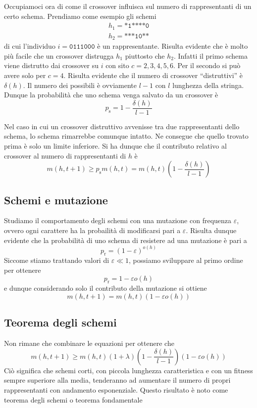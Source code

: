 \documentclass[a4paper, 11pt]{article}
\newcommand{\code}{\texttt}
\begin{document}
Occupiamoci ora di come il crossover influisca sul numero di rappresentanti di
un certo schema. Prendiamo come esempio gli schemi
\begin{align*}
h_1=\code{*1****0}\\
h_2=\code{***10**}
\end{align*}
di cui l'individuo $i=\code{0111000}$ \`e un rappresentante. Risulta evidente
che \`e molto pi\`u facile che un crossover distrugga $h_1$ piuttosto che
$h_2$. Infatti il primo schema viene distrutto dai crossover su $i$ con sito
$c=2,3,4,5,6$. Per il secondo si pu\`o avere solo per $c=4$. Risulta evidente
che il numero di crossover ``distruttivi'' \`e $\delta (h)$. Il numero dei
possibili \`e ovviamente $l-1$ con $l$ lunghezza della stringa. Dunque la
probabilit\`a che uno schema venga salvato da un crossover \`e
$$p_\text{s}=1-\frac{\delta (h)}{l-1}$$

Nel caso in cui un crossover distruttivo avvenisse tra due rappresentanti dello
schema, lo schema rimarrebbe comunque intatto. Ne consegue che quello trovato
prima \`e solo un limite inferiore. Si ha dunque che il contributo relativo al
crossover al numero di rappresentanti di $h$ \`e
$$m(h, t+1)\geq p_\text{s}m(h,t)=m(h,t)\left(1- \frac{\delta (h)}{l-1} \right)$$


\subsection{Schemi e mutazione}

Studiamo il comportamento degli schemi con una mutazione con frequenza
$\varepsilon$, ovvero ogni carattere ha la probailit\`a di modificarsi pari a
$\varepsilon$. Risulta dunque evidente che la probabilit\`a di uno schema di
resistere ad una mutazione \`e pari a 
$$p_\text{r}=\left(1-\varepsilon\right)^{o(h)}$$
Siccome stiamo trattando valori di $\varepsilon \ll 1$, possiamo sviluppare al
primo ordine per ottenere
$$p_\text{r}=1-\varepsilon o(h)$$
e dunque considerando solo il contributo della mutazione si ottiene
$$m(h,t+1)=m(h,t)\left(1-\varepsilon o(h)\right)$$


\subsection{Teorema degli schemi}

Non rimane che combinare le equazioni per ottenere che
$$m(h, t+1) \geq m(h,t) \left(1+\lambda \right) \left(1-\frac{\delta
(h)}{l-1}\right) \left(1- \varepsilon o(h) \right)$$
Ci\`o significa che schemi corti, con piccola lunghezza caratteristica e con un
fitness sempre superiore alla media, tenderanno ad aumentare il numero di propri
rappresentanti con andamento esponenziale. Questo risultato \`e noto come
teorema degli schemi o teorema fondamentale 
\end{document}
